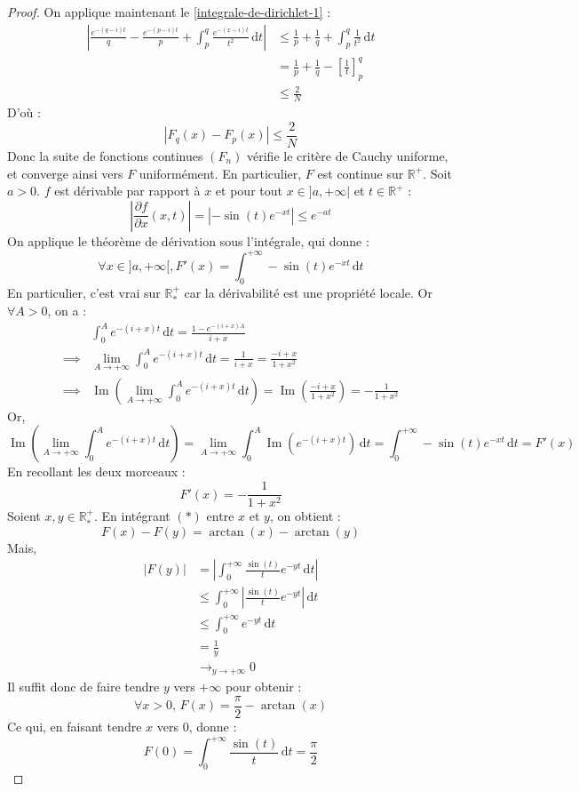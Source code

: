 \begin{proof}
		On applique maintenant le \cref{integrale-de-dirichlet-1} :
		\begin{align*}
			\left| \frac{e^{-(q-i)t}}{q} - \frac{e^{-(p-i)t}}{p} +  \int_p^q \frac{e^{-(x-i)t}}{t^2} \, \mathrm{d}t \right| &\leq \frac{1}{p} + \frac{1}{q} + \int_p^q \frac{1}{t^2} \, \mathrm{d}t \\
			&= \frac{1}{p} + \frac{1}{q} - \left[ \frac{1}{t} \right]^q_p \\
			&\leq \frac{2}{N}
		\end{align*}
		D'où :
		\[ |F_q(x) - F_p(x)| \leq \frac{2}{N} \]
		Donc la suite de fonctions continues $(F_n)$ vérifie le critère de Cauchy uniforme, et converge ainsi vers $F$ uniformément. En particulier, $F$ est continue sur $\mathbb{R}^+$.
		\newpar
		Soit $a > 0$. $f$ est dérivable par rapport à $x$ et pour tout $x \in ]a, +\infty|$ et $t \in \mathbb{R}^+$ :
		\[ \left| \frac{\partial f}{\partial x} (x, t) \right| = |-\sin(t) e^{-xt}| \leq e^{-at} \]
		On applique le théorème de dérivation sous l'intégrale, qui donne :
		\[ \forall x \in ]a, +\infty[, F'(x) = \int_0^{+\infty} -\sin(t) e^{-xt} \, \mathrm{d}t \]
		En particulier, c'est vrai sur $\mathbb{R}^+_*$ car la dérivabilité est une propriété locale. Or $\forall A > 0$, on a :
		\begin{align*}
			& \int_0^A e^{-(i+x)t} \, \mathrm{d}t = \frac{1-e^{-(i+x)A}}{i+x} \\
			\implies & \lim_{A \rightarrow +\infty} \int_0^A e^{-(i+x)t} \, \mathrm{d}t = \frac{1}{i+x} = \frac{-i+x}{1 + x^2} \\
			\implies & \operatorname{Im} \left( \lim_{A \rightarrow +\infty} \int_0^A e^{-(i+x)t} \, \mathrm{d}t \right) = \operatorname{Im} \left( \frac{-i+x}{1 + x^2} \right) = -\frac{1}{1 + x^2}
		\end{align*}
		Or,
		\[ \operatorname{Im} \left( \lim_{A \rightarrow +\infty} \int_0^A e^{-(i+x)t} \, \mathrm{d}t \right) = \lim_{A \rightarrow +\infty} \int_0^A \operatorname{Im} \left( e^{-(i+x)t} \right) \, \mathrm{d}t = \int_0^{+\infty} -\sin(t) e^{-xt} \, \mathrm{d}t = F'(x) \]
		En recollant les deux morceaux :
		\[ F'(x) = -\frac{1}{1+x^2} \tag{$*$} \]
		Soient $x, y \in \mathbb{R}^+_*$. En intégrant $(*)$ entre $x$ et $y$, on obtient :
		\[ F(x) - F(y) = \arctan(x) - \arctan(y) \]
		Mais,
		\begin{align*}
			|F(y)| &= \left| \int_0^{+\infty} \frac{\sin(t)}{t} e^{-yt} \, \mathrm{d}t \right| \\
			&\leq \int_0^{+\infty} \left| \frac{\sin(t)}{t} e^{-yt} \right| \, \mathrm{d}t \\
			&\leq \int_0^{+\infty} e^{-yt} \, \mathrm{d}t \\
			&= \frac{1}{y} \\
			&\longrightarrow_{y \rightarrow +\infty} 0
		\end{align*}
		Il suffit donc de faire tendre $y$ vers $+\infty$ pour obtenir :
		\[ \forall x > 0, \, F(x) = \frac{\pi}{2} - \arctan(x) \]
		Ce qui, en faisant tendre $x$ vers $0$, donne :
		\[ F(0) = \int_0^{+\infty} \frac{\sin(t)}{t} \, \mathrm{d}t = \frac{\pi}{2} \]
	\end{proof}

